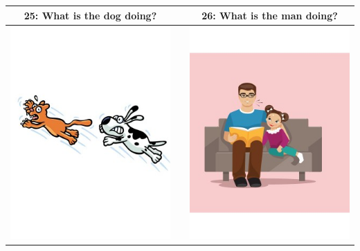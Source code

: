 \documentclass[12pt,notitlepage]{article}
\begin{document}
\begin{center}
\begin{tabular}{|c|c|c|}
\hline
25: What is the dog doing? && 26: What is the man doing? \\
\hline
\includegraphics[width=20em,trim=0 0 0 -3]{figures/I25.jpg} & & \includegraphics[width=20em,trim=0 0 0 -3]{figures/I26.jpg} \\
\hline
\end{tabular}
\vspace{1em} \\



\end{center}
\end{document}
